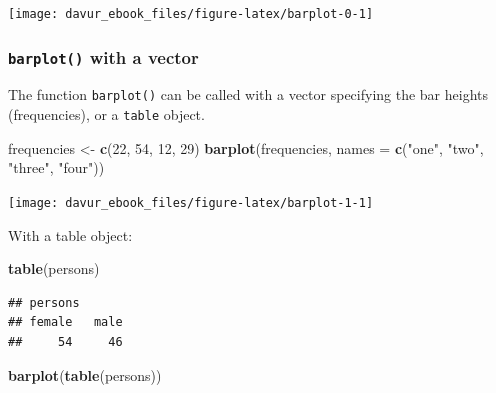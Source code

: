 \documentclass[]{book}
\newenvironment{Shaded}{\begin{snugshade}}{\end{snugshade}}
\newcommand{\DataTypeTok}[1]{\textcolor[rgb]{0.13,0.29,0.53}{#1}}
\newcommand{\DecValTok}[1]{\textcolor[rgb]{0.00,0.00,0.81}{#1}}
\newcommand{\KeywordTok}[1]{\textcolor[rgb]{0.13,0.29,0.53}{\textbf{#1}}}
\newcommand{\NormalTok}[1]{#1}
\newcommand{\StringTok}[1]{\textcolor[rgb]{0.31,0.60,0.02}{#1}}
\begin{document}
\begin{center}\texttt{[image: davur\_ebook\_files/figure-latex/barplot-0-1]} \end{center}

\hypertarget{barplot-with-a-vector}{%
\subsubsection*{\texorpdfstring{\texttt{barplot()} with a vector}{barplot() with a vector}}\label{barplot-with-a-vector}}

The function \texttt{barplot()} can be called with a vector specifying the bar heights (frequencies), or a \texttt{table} object.

\begin{Shaded}
\begin{Highlighting}[]
\NormalTok{frequencies <-}\StringTok{ }\KeywordTok{c}\NormalTok{(}\DecValTok{22}\NormalTok{, }\DecValTok{54}\NormalTok{, }\DecValTok{12}\NormalTok{, }\DecValTok{29}\NormalTok{)}
\KeywordTok{barplot}\NormalTok{(frequencies, }\DataTypeTok{names =} \KeywordTok{c}\NormalTok{(}\StringTok{"one"}\NormalTok{, }\StringTok{"two"}\NormalTok{, }\StringTok{"three"}\NormalTok{, }\StringTok{"four"}\NormalTok{))}
\end{Highlighting}
\end{Shaded}

\begin{center}\texttt{[image: davur\_ebook\_files/figure-latex/barplot-1-1]} \end{center}

With a table object:

\begin{Shaded}
\begin{Highlighting}[]
\KeywordTok{table}\NormalTok{(persons)}
\end{Highlighting}
\end{Shaded}

\begin{verbatim}
## persons
## female   male 
##     54     46
\end{verbatim}

\begin{Shaded}
\begin{Highlighting}[]
\KeywordTok{barplot}\NormalTok{(}\KeywordTok{table}\NormalTok{(persons))}
\end{Highlighting}
\end{Shaded}
\end{document}
